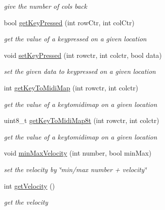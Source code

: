 \begin{DoxyCompactItemize}
\begin{DoxyCompactList}\small\item\em give the number of cols back \end{DoxyCompactList}\item 
bool \hyperlink{classlight_music_1_1key_matrix_aa24325eefb6e1d1c658a95414d178152}{get\+Key\+Pressed} (int row\+Ctr, int col\+Ctr)
\begin{DoxyCompactList}\small\item\em get the value of a keypressed on a given location \end{DoxyCompactList}\item 
void \hyperlink{classlight_music_1_1key_matrix_a6b14156dc4fe97c317878e638e25b065}{set\+Key\+Pressed} (int rowctr, int colctr, bool data)
\begin{DoxyCompactList}\small\item\em set the given data to keypressed on a given location \end{DoxyCompactList}\item 
int \hyperlink{classlight_music_1_1key_matrix_a0da0736764140f22eeb6874f4b5d2080}{get\+Key\+To\+Midi\+Map} (int rowctr, int colctr)
\begin{DoxyCompactList}\small\item\em get the value of a keytomidimap on a given location \end{DoxyCompactList}\item 
uint8\+\_\+t \hyperlink{classlight_music_1_1key_matrix_a3e25f2258ac3be18fe6e85f6cf0cccfa}{get\+Key\+To\+Midi\+Map8t} (int rowctr, int colctr)
\begin{DoxyCompactList}\small\item\em get the value of a keytomidimap on a given location \end{DoxyCompactList}\item 
void \hyperlink{classlight_music_1_1key_matrix_a21cce0cc53842750aac7fad18652e697}{min\+Max\+Velocity} (int number, bool min\+Max)
\begin{DoxyCompactList}\small\item\em set the velocity by \char`\"{}min/max number + velocity\char`\"{} \end{DoxyCompactList}\item 
int \hyperlink{classlight_music_1_1key_matrix_ac0598a969eaf6469ccac2206f4456f3b}{get\+Velocity} ()
\begin{DoxyCompactList}\small\item\em get the velocity \end{DoxyCompactList}\item 

\end{DoxyCompactItemize}
